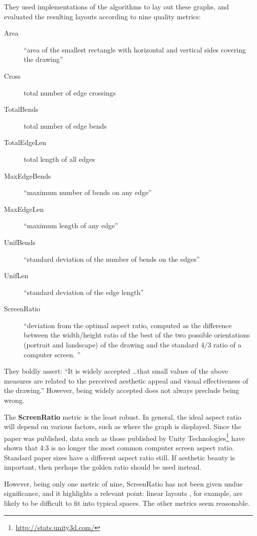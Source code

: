 They used implementations of the algorithms to lay out these graphs, and evaluated the resulting layouts according to nine quality metrics:

\begin{description}
    \item[Area]
``area of the smallest rectangle with horizontal and vertical sides covering the drawing''
    \item[Cross]
total number of edge crossings
    \item[TotalBends]
total number of edge bends
    \item[TotalEdgeLen]
total length of all edges
    \item[MaxEdgeBends]
``maximum number of bends on any edge''
    \item[MaxEdgeLen]
``maximum length of any edge''
    \item[UnifBends]
``standard deviation of the number of bends on the edges''
    \item[UnifLen]
``standard deviation of the edge length''
    \item[ScreenRatio]
``deviation from the optimal aspect ratio, computed as the difference between the width/height ratio of the best of the two possible orientations (portrait and landscape) of the drawing and the standard 4/3 ratio of a computer screen. ''
\end{description}

They boldly assert: ``It is widely accepted \ldots that small values of the above measures are related to the perceived aesthetic appeal and visual effectiveness of the drawing.''
However, being widely accepted does not always preclude being wrong.

The \textbf{ScreenRatio} metric is the least robust.
In general, the ideal aspect ratio will depend on various factors, such as where the graph is displayed.
Since the paper was published, data such as those published by Unity Technologies\footnote{\url{http://stats.unity3d.com/}} have shown that 4:3 is no longer the most common computer screen aspect ratio.
Standard paper sizes have a different aspect ratio still.
If aesthetic beauty is important, then perhaps the golden ratio \cite{Harrington:2004:AMA:1030397.1030419} should be used instead.

However, being only one metric of nine, ScreenRatio has not been given undue significance, and it highlights a relevant point: linear layouts , for example, are likely to be difficult to fit into typical spaces.
The other metrics seem reasonable.



